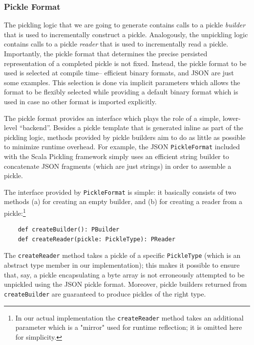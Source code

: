 \documentclass[preprint,10pt]{sigplanconf}
\theoremstyle{definition}
\theoremstyle{definition}
\newcommand{\term}[1]{\mbox{\texttt{#1}}}
\begin{document}
\subsubsection{Pickle Format}
\label{sec:pickleformat}

The pickling logic that we are going to generate contains calls to a pickle
{\em builder} that is used to incrementally construct a pickle. Analogously,
the unpickling logic contains calls to a pickle {\em reader} that is used to
incrementally read a pickle. Importantly, the pickle format that determines
the precise persisted representation of a completed pickle is not fixed.
Instead, the pickle format to be used is selected at compile time-- efficient
binary formats, and JSON are just some examples. This selection is done via
implicit parameters which allows the format to be flexibly selected while
providing a default binary format which is used in case no other format is
imported explicitly.

The pickle format provides an interface which plays the role of a simple,
lower-level ``backend''. Besides a pickle template that is generated inline as
part of the pickling logic, methods provided by pickle builders aim to do as
little as possible to minimize runtime overhead. For example,  the JSON
\term{PickleFormat} included with the Scala Pickling framework simply uses an
efficient string builder to concatenate JSON fragments (which are just
strings) in order to assemble a pickle.

The interface provided by \term{PickleFormat} is simple: it basically consists
of two methods (a) for creating an empty builder, and (b) for creating a
reader from a pickle:\footnote{In our actual implementation the
\term{createReader} method takes an additional parameter which is a "mirror"
used for runtime reflection; it is omitted here for simplicity.}

\begin{lstlisting}
    def createBuilder(): PBuilder
    def createReader(pickle: PickleType): PReader
\end{lstlisting}

The \term{createReader} method takes a pickle of a specific \term{PickleType}
(which is an abstract type member in our implementation); this makes it
possible to ensure that, say, a pickle encapsulating a byte array is not
erroneously attempted to be unpickled using the JSON pickle format. Moreover,
pickle builders returned from \verb|createBuilder| are guaranteed to produce
pickles of the right type.
\end{document}
